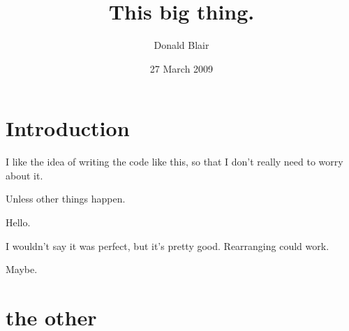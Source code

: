\documentclass[pre,preprint, 11pt]{revtex4}
\date{27 March 2009}
\begin{document}
\author{Donald Blair}
\title{This big thing.}

\maketitle

\section{Introduction}
\label{sec-1}

I like the idea of writing the code like this, so that I don't really need to worry about it.

Unless other things happen. 

Hello. \cite{AnMa}


I wouldn't say it was perfect, but it's pretty good. Rearranging could work.

Maybe.

 



\section{the other}
\label{sec-2}

%


\end{document}
